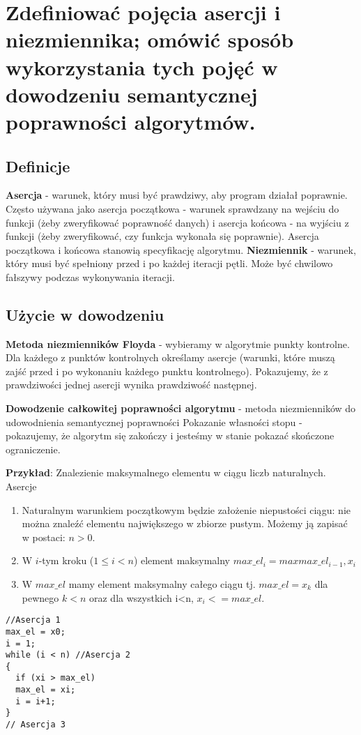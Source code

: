 \section{Zdefiniować pojęcia asercji i niezmiennika; omówić sposób wykorzystania tych pojęć w dowodzeniu semantycznej poprawności algorytmów.}

\subsection{Definicje}
\textbf{Asercja} - warunek, który musi być prawdziwy, aby program działał poprawnie.
Często używana jako asercja początkowa - warunek sprawdzany na wejściu do funkcji (żeby zweryfikować poprawność danych)
i asercja końcowa - na wyjściu z funkcji (żeby zweryfikować, czy funkcja wykonała się poprawnie).
Asercja początkowa i końcowa stanowią specyfikację algorytmu.
\textbf{Niezmiennik} - warunek, który musi być spełniony przed i po każdej iteracji pętli.
Może być chwilowo fałszywy podczas wykonywania iteracji.

\subsection{Użycie w dowodzeniu}
\textbf{Metoda niezmienników Floyda} -
wybieramy w algorytmie punkty kontrolne.
Dla każdego z punktów kontrolnych określamy asercje
(warunki, które muszą zajść przed i po wykonaniu każdego punktu kontrolnego).
Pokazujemy, że z prawdziwości jednej asercji wynika prawdziwość następnej.

\textbf{Dowodzenie całkowitej poprawności algorytmu} -
metoda niezmienników do udowodnienia semantycznej poprawności
Pokazanie własności stopu - pokazujemy, że algorytm się zakończy i jesteśmy w stanie pokazać skończone ograniczenie.

\textbf{Przykład}: Znalezienie maksymalnego elementu w ciągu liczb naturalnych. Asercje
\begin{enumerate}[itemsep=0pt,partopsep=0pt, parsep=0pt]
    \item Naturalnym warunkiem początkowym będzie założenie niepustości ciągu: nie można
    znaleźć elementu największego w zbiorze pustym. Możemy ją zapisać w postaci: $n>0$.
    \item W $i$-tym kroku ($1\leq i<n$) element maksymalny $max\_el_i = max{max\_el_{i-1}, x_i}$
    \item W $max\_el$ mamy element maksymalny całego ciągu tj. $max\_el = x_k$
    dla pewnego $k < n$ oraz dla wszystkich i<n, $x_i <= max\_el$.
\end{enumerate}

\begin{samepage}
    \begin{verbatim}
//Asercja 1
max_el = x0;
i = 1;
while (i < n) //Asercja 2
{
  if (xi > max_el)
  max_el = xi;
  i = i+1;
}
// Asercja 3
    \end{verbatim}
\end{samepage}
